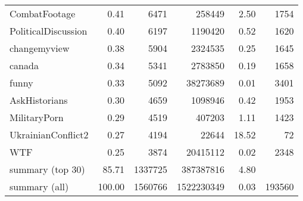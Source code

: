 \begin{tabular}{lrrrrr}
CombatFootage       &    0.41 &     6471 &      258449 &     2.50 &    1754 \\
PoliticalDiscussion &    0.40 &     6197 &     1190420 &     0.52 &    1620 \\
changemyview        &    0.38 &     5904 &     2324535 &     0.25 &    1645 \\
canada              &    0.34 &     5341 &     2783850 &     0.19 &    1658 \\
funny               &    0.33 &     5092 &    38273689 &     0.01 &    3401 \\
AskHistorians       &    0.30 &     4659 &     1098946 &     0.42 &    1953 \\
MilitaryPorn        &    0.29 &     4519 &      407203 &     1.11 &    1423 \\
UkrainianConflict2  &    0.27 &     4194 &       22644 &    18.52 &      72 \\
WTF                 &    0.25 &     3874 &    20415112 &     0.02 &    2348 \\
summary (top 30)    &   85.71 &  1337725 &   387387816 &     4.80 &         \\
summary (all)       &  100.00 &  1560766 &  1522230349 &     0.03 &  193560 \\
\bottomrule
\end{tabular}
